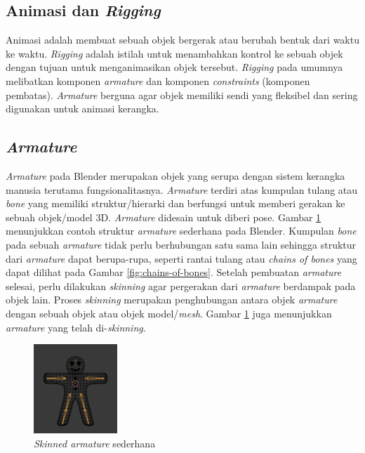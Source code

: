 \subsection{Animasi dan \textit{Rigging}}

Animasi adalah membuat sebuah objek bergerak atau berubah bentuk dari waktu ke
waktu. \textit{Rigging} adalah istilah untuk menambahkan kontrol ke sebuah objek
dengan tujuan untuk menganimasikan objek tersebut. \textit{Rigging} pada umumnya
melibatkan komponen \textit{armature} dan komponen \textit{constraints}
(komponen pembatas). \textit{Armature} berguna agar objek memiliki sendi yang
fleksibel dan sering digunakan untuk animasi kerangka.

\subsection{\textit{Armature}}

\textit{Armature} pada Blender merupakan objek yang serupa dengan sistem
kerangka manusia terutama fungsionalitasnya. \textit{Armature} terdiri atas
kumpulan tulang atau \textit{bone} yang memiliki struktur/hierarki dan berfungsi
untuk memberi gerakan ke sebuah objek/model 3D. \textit{Armature} didesain untuk
diberi pose. Gambar \ref{fig:basic-armature} menunjukkan contoh struktur
\textit{armature} sederhana pada Blender. Kumpulan \textit{bone} pada sebuah
\textit{armature} tidak perlu berhubungan satu sama lain sehingga struktur dari
\textit{armature} dapat berupa-rupa, seperti rantai tulang atau \textit{chains
of bones} yang dapat dilihat pada Gambar \ref{fig:chains-of-bones}. Setelah
pembuatan \textit{armature} selesai, perlu dilakukan \textit{skinning} agar
pergerakan dari \textit{armature} berdampak pada objek lain. Proses
\textit{skinning} merupakan penghubungan antara objek \textit{armature} dengan
sebuah objek atau objek model/\textit{mesh}. Gambar \ref{fig:basic-armature}
juga menunjukkan \textit{armature} yang telah di-\textit{skinning}.

\begin{figure}[ht]
    \centering
    \includegraphics[width=0.28\textwidth]{resources/chapter-2-basic-armature.png}
    \caption{\textit{Skinned armature} sederhana \parencite{blender-manual}}
    \label{fig:basic-armature}
\end{figure}

